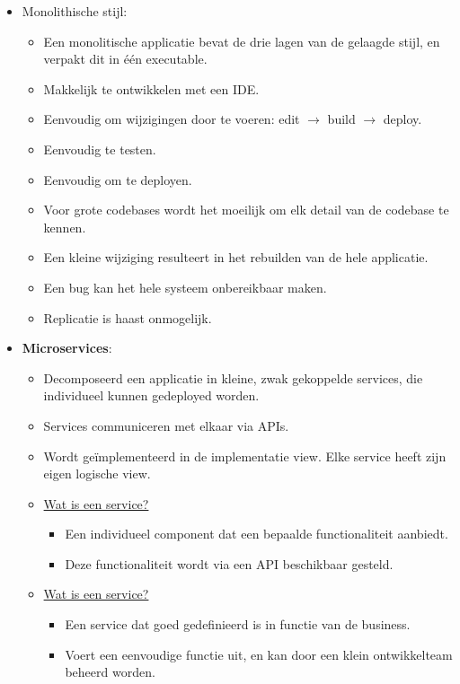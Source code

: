 \begin{itemize}
\begin{itemize}
		\end{itemize}
		\item[\info] Monolithische stijl:
		\begin{itemize}
			\item[\info] Een monolitische applicatie bevat de drie lagen van de gelaagde stijl, en verpakt dit in één executable.
			\item[\good] Makkelijk te ontwikkelen met een IDE.
			\item[\good] Eenvoudig om wijzigingen door te voeren: edit $\rightarrow$ build $\rightarrow$ deploy.
			\item[\good] Eenvoudig te testen.
			\item[\good] Eenvoudig om te deployen.
			\item[\alert] Voor grote codebases wordt het moeilijk om elk detail van de codebase te kennen.
			\item[\alert] Een kleine wijziging resulteert in het rebuilden van de hele applicatie.
			\item[\alert] Een bug kan het hele systeem onbereikbaar maken.
			\item[\alert] Replicatie is haast onmogelijk. 
		\end{itemize}
		\item[\info] \textbf{Microservices}:
		\begin{itemize}
			\item[\info] Decomposeerd een applicatie in kleine, zwak gekoppelde services, die individueel kunnen gedeployed worden.
			\item[\info] Services communiceren met elkaar via APIs.
			\item[\info] Wordt geïmplementeerd in de implementatie view. Elke service heeft zijn eigen logische view.
			\item[\info] \underline{Wat is een service?}
			\begin{itemize}
				\item[\info] Een individueel component dat een bepaalde functionaliteit aanbiedt.
				\item[\info] Deze functionaliteit wordt via een API beschikbaar gesteld. 
			\end{itemize}
			\item[\info] \underline{Wat is een service?}
			\begin{itemize}
				\item[\info] Een service dat goed gedefinieerd is in functie van de business.
				\item[\info] Voert een eenvoudige functie uit, en kan door een klein ontwikkelteam beheerd worden.

\end{itemize}
\end{itemize}
\end{itemize}
